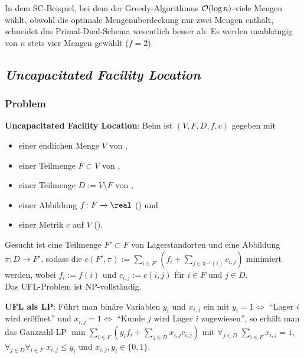 \linie

In dem SC-Beispiel, bei dem der Greedy-Algorithmus $\mathcal{O}(\log n)$-viele Mengen wählt,
obwohl die optimale Mengenüberdeckung nur zwei Mengen enthält,
schneidet das Primal-Dual-Schema wesentlich besser ab:
Es werden unabhängig von $n$ stets vier Mengen gewählt
($f = 2$).

\pagebreak

\subsection{%
    \emph{Uncapacitated Facility Location}%
}

\subsubsection{%
    Problem%
}

\textbf{Uncapacitated Facility Location}:
Beim  ist $(V, F, D, f, c)$ gegeben mit
\begin{itemize}
    \item
    einer endlichen Menge $V$ von ,

    \item
    einer Teilmenge $F \subset V$ von ,

    \item
    einer Teilmenge $D := V \setminus F$ von ,

    \item
    einer Abbildung $f\colon F \to \real$ () und

    \item
    einer Metrik $c$ auf $V$ ().
\end{itemize}
Gesucht ist eine Teilmenge $F' \subset F$ von Lagerstandorten und eine Abbildung
$\pi\colon D \to F'$, sodass die 
$c(F', \pi) := \sum_{i \in F'} (f_i + \sum_{j \in \pi^{-1}(i)} c_{i,j})$ minimiert werden,
wobei $f_i := f(i)$ und $c_{i,j} := c(i, j)$ für $i \in F$ und $j \in D$.\\
Das UFL-Problem ist NP-vollständig.

\linie

\textbf{UFL als LP}:
Führt man binäre Variablen $y_i$ und $x_{i,j}$ ein mit
$y_i = 1 \iff$ "`Lager $i$ wird eröffnet"' und
$x_{i,j} = 1 \iff$ "`Kunde $j$ wird Lager $i$ zugewiesen"',
so erhält man das Ganzzahl-LP
$\min \sum_{i \in F} (y_i f_i + \sum_{j \in D} x_{i,j} c_{i,j})$ mit
$\forall_{j \in D}\; \sum_{i \in F} x_{i,j} = 1$,
$\forall_{j \in D} \forall_{i \in F}\; x_{i,j} \le y_i$ und
$x_{i,j}, y_i \in \{0, 1\}$.

